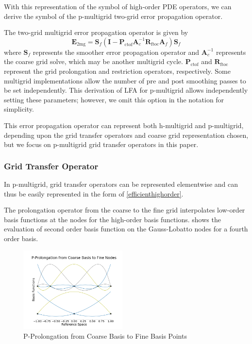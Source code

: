\documentclass[review]{siamart190516}
\begin{document}
With this representation of the symbol of high-order PDE operators, we can derive the symbol of the p-multigrid two-grid error propagation operator.

The two-grid multigrid error propagation operator is given by
\begin{equation}
\mathbf{E}_{\text{2mg}} = \mathbf{S}_f \left( \mathbf{I} - \mathbf{P}_{\text{ctof}} \mathbf{A}_c^{-1} \mathbf{R}_{\text{ftoc}} \mathbf{A}_f \right) \mathbf{S}_f
\end{equation}
where $\mathbf{S}_f$ represents the smoother error propagation operator and $\mathbf{A}_c^{-1}$ represents the coarse grid solve, which may be another multigrid cycle.
$\mathbf{P}_{\text{ctof}}$ and $\mathbf{R}_{\text{ftoc}}$ represent the grid prolongation and restriction operators, respectively.
Some multigrid implementations allow the number of pre and post smoothing passes to be set independently.
This derivation of LFA for p-multigrid allows independently setting these parameters; however, we omit this option in the notation for simplicity.

This error propagation operator can represent both h-multigrid and p-multigrid, depending upon the grid transfer operators and coarse grid representation chosen, but we focus on p-multigrid grid transfer operators in this paper.

\subsubsection{Grid Transfer Operator}\label{sec:grids}

In p-multigrid, grid transfer operators can be represented elementwise and can thus be easily represented in the form of \cref{efficienthighorder}.

The prolongation operator from the coarse to the fine grid interpolates low-order basis functions at the nodes for the high-order basis functions.
 shows the evaluation of second order basis function on the Gauss-Lobatto nodes for a fourth order basis.

\begin{figure}[!ht]
  \centering
  \includegraphics[width=0.48\textwidth]{img/pProlongation}
  \caption{P-Prolongation from Coarse Basis to Fine Basis Points}
  \label{fig:p_prolongation}
\end{figure}
\end{document}
